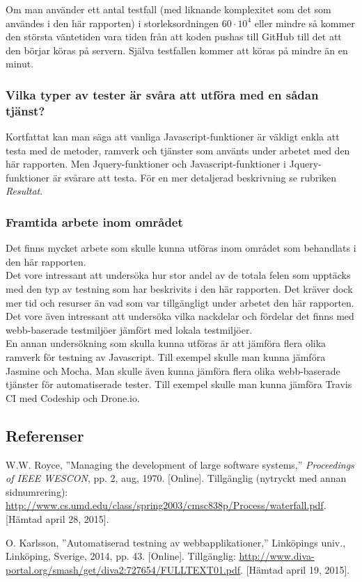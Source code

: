 Om man använder ett antal testfall (med liknande komplexitet som
det som användes i den här rapporten) i storleksordningen $60 \cdot 10^4$ eller
mindre så kommer den största väntetiden vara tiden från att koden
pushas till GitHub till det att den börjar köras på servern. Själva
testfallen kommer att köras på mindre än en minut.

\subsubsection{Vilka typer av tester är svåra att utföra 
med en sådan tjänst?}
Kortfattat kan man säga att vanliga Javascript-funktioner är
väldigt enkla att testa med de metoder, ramverk och tjänster som
använts under arbetet med den här rapporten. Men Jquery-funktioner och
Javascript-funktioner i Jquery-funktioner är svårare att
testa. För en mer detaljerad beskrivning se rubriken \emph{Resultat}.

\subsubsection{Framtida arbete inom området}
Det finns mycket arbete som skulle kunna utföras inom området som behandlats
i den här rapporten.\\

Det vore intressant att undersöka hur stor andel av de totala felen
som upptäcks med den typ av testning som har beskrivits i den här rapporten.
Det kräver dock mer tid och resurser än vad som var tillgängligt under
arbetet den här rapporten.\\

Det vore även intressant att undersöka vilka nackdelar och fördelar det
finns med webb-baserade testmiljöer jämfört med lokala
testmiljöer.\\

En annan undersökning som skulla kunna utföras är att jämföra
flera olika ramverk för testning av Javascript. Till exempel skulle
man kunna jämföra Jasmine och Mocha. Man skulle även kunna jämföra
flera olika webb-baserade tjänster för automatiserade tester. Till
exempel skulle man kunna jämföra Travis CI med Codeship och Drone.io.

\subsection{Referenser}
\vspace{-9mm}
\renewcommand{\refname}{}
\begin{thebibliography}{9}

W.W. Royce, ''Managing the development of large software systems,''
\textit{Proceedings of IEEE WESCON}, pp. 2, aug, 1970.
[Online].
Tillgänglig (nytryckt med annan sidnumrering):
\url{http://www.cs.umd.edu/class/spring2003/cmsc838p/Process/waterfall.pdf}.
[Hämtad april 28, 2015].

O. Karlsson, ''Automatiserad testning av webbapplikationer,''
Linköpings univ., Linköping, Sverige, 2014, pp. 43.
[Online]. 
Tillgänglig: 
\url{http://www.diva-portal.org/smash/get/diva2:727654/FULLTEXT01.pdf}.
[Hämtad april 19, 2015].

\end{thebibliography}
